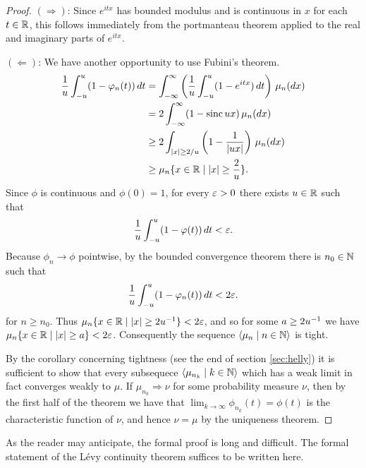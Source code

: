 \documentclass[leqno]{article}
\theoremstyle{definition}
\newcommand{\bldset}[2]{\{{#1}\mid{#2}\}}
\newcommand{\bldseq}[2]{\langle{#1}\mid{#2}\rangle}
\newcommand\sinc{\mathop{\text{sinc}}\nolimits}
\begin{document}
\begin{proof}
$(\Longrightarrow)$: Since $e^{itx}$ has bounded modulus and is continuous in $x$ for each $t \in \mathbb{R}$, this follows immediately from the portmanteau theorem applied to the real and imaginary parts of $e^{itx}$.

$(\Longleftarrow)$: We have another opportunity to use Fubini's theorem.
\begin{align*}
\frac{1}{u} \int_{-u}^u (1 - \phi_n(t)) \, dt &= \int_{-\infty}^\infty \left(\frac{1}{u}\int_{-u}^u (1 - e^{itx}) \, dt\right) \, \mu_n(dx) \\
                                              &= 2\int_{-\infty}^\infty (1 - \sinc ux) \, \mu_n(dx) \\
                                              &\ge 2\int_{|x| \ge 2/u} \left(1 - \frac{1}{|ux|}\right) \, \mu_n(dx) \\
                                              &\ge \mu_n \bldset{x \in \R}{|x| \ge \frac{2}{u}}.
\end{align*}
Since $\phi$ is continuous and $\phi(0) = 1$, for every $\varepsilon > 0$ there exists $u \in \mathbb{R}$ such that
\[ \frac{1}{u} \int_{-u}^u (1 - \varphi(t)) \, dt < \varepsilon. \]
Because $\phi_n \rightarrow \phi$ pointwise, by the bounded convergence theorem there is $n_0 \in \mathbb{N}$ such that
\[ \frac{1}{u} \int_{-u}^u (1 - \varphi_n(t)) \, dt < 2\varepsilon. \]
for $n \ge n_0$. Thus $\mu_n \bldset{x \in \R}{|x| \ge 2u\inv} < 2\eps$, and so for some $a \ge 2u^{-1}$ we have $\mu_n \bldset{x \in \R}{|x| \ge a} < 2\eps$. Consequently the sequence $\bldseq{\mu_n}{n \in \N}$ is tight.

By the corollary concerning tightness (see the end of section \ref{sec:helly}) it is sufficient to show that every subsequece $\bldseq{\mu_{n_k}}{k \in \N}$ which has a weak limit in fact converges weakly to $\mu$. If $\mu_{n_k} \Rightarrow \nu$ for some probability measure $\nu$, then by the first half of the theorem we have that $\lim_{k \rightarrow \infty} \phi_{n_k}(t) = \phi(t)$ is the characteristic function of $\nu$, and hence $\nu = \mu$ by the uniqueness theorem.
\end{proof}

As the reader may anticipate, the formal proof is long and difficult. The formal statement of the L\'evy continuity theorem suffices to be written here.

\medskip
\end{document}
